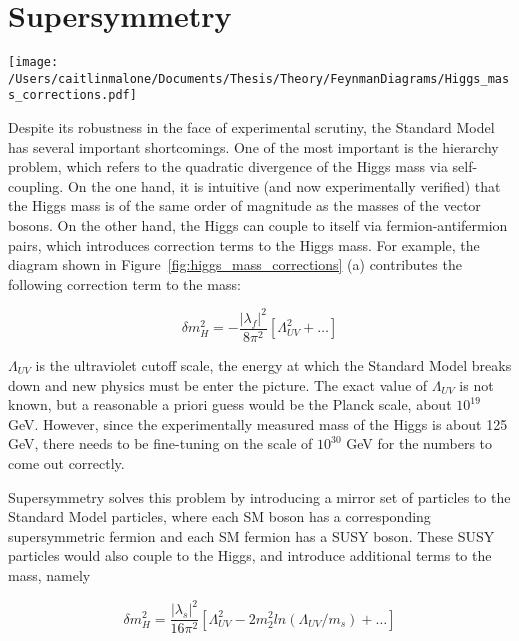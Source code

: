 \documentclass[11pt]{article}
\begin{document}
 
 
\section{Supersymmetry}

\begin{centering}
\texttt{[image: /Users/caitlinmalone/Documents/Thesis/Theory/FeynmanDiagrams/Higgs\_mass\_corrections.pdf]}\label{fig:higgs_mass_corrections}
\end{centering}

Despite its robustness in the face of experimental scrutiny, the Standard Model has several important shortcomings.  One of the most important is the hierarchy problem, which refers to the quadratic divergence of the Higgs mass via self-coupling.  On the one hand, it is intuitive (and now experimentally verified) that the Higgs mass is of the same order of magnitude as the masses of the vector bosons.  On the other hand, the Higgs can couple to itself via fermion-antifermion pairs, which introduces correction terms to the Higgs mass.  For example, the diagram shown in Figure~\ref{fig:higgs_mass_corrections} (a) contributes the following correction term to the mass:

\begin{equation}
\delta m_H^2 = -\frac{|\lambda_f |^2}{8\pi^2}[\Lambda_{UV}^2+\ldots]
\end{equation}

$\Lambda_{UV}$ is the ultraviolet cutoff scale, the energy at which the Standard Model breaks down and new physics must be enter the picture.  The exact value of $\Lambda_{UV}$ is not known, but a reasonable a priori guess would be the Planck scale, about $10^{19}$ GeV.  However, since the experimentally measured mass of the Higgs is about 125 GeV, there needs to be fine-tuning on the scale of $10^{30}$ GeV for the numbers to come out correctly.

Supersymmetry solves this problem by introducing a mirror set of particles to the Standard Model particles, where each SM boson has a corresponding supersymmetric fermion and each SM fermion has a SUSY boson.  These SUSY particles would also couple to the Higgs, and introduce additional terms to the mass, namely

\begin{equation}
\delta m_H^2 = \frac{|\lambda_s |^2}{16\pi^2}[\Lambda_{UV}^2-2m_2^2ln(\Lambda_{UV}/m_s)+\ldots]
\end{equation}
\end{document}
